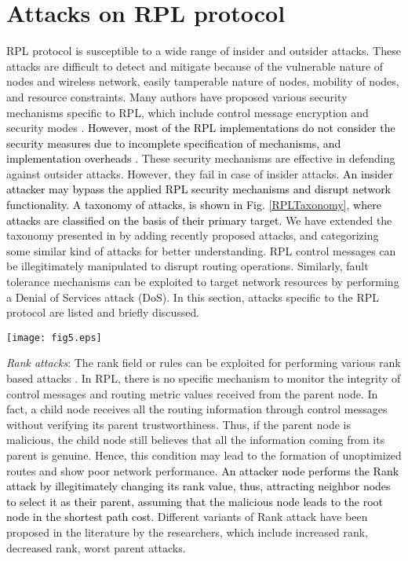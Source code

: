 \documentclass[10pt,journal,sort & compress]{IEEEtran}
\begin{document}
\section{Attacks on RPL protocol}\label{Taxonomy of Attacks on RPL protocol}
RPL protocol is susceptible to a wide range of insider and outsider attacks. These attacks are difficult to detect and mitigate because of the vulnerable nature of nodes and wireless network, easily tamperable nature of nodes, mobility of nodes, and resource constraints. Many authors have proposed various security mechanisms specific to RPL, which include control message encryption and security modes \cite{Perazzo2017a}. \textcolor{black}{However, most of the RPL implementations do not consider the security measures due to incomplete specification of mechanisms, and implementation overheads \cite{KAMGUEU201810}.} These security mechanisms are effective in defending against outsider attacks. However, they fail in case of insider attacks. \textcolor{black}{An insider attacker may bypass the applied RPL security mechanisms and disrupt network functionality.} \textcolor{black}{A taxonomy of attacks, is shown in Fig. \ref{RPLTaxonomy}, where attacks are classified on the basis of their primary target.} We have extended the taxonomy presented in \cite{Mayzaud2016Taxanomy} by adding recently proposed attacks, and categorizing some similar kind of attacks for better understanding. RPL control messages can be illegitimately manipulated to disrupt routing operations. Similarly, fault tolerance mechanisms can be exploited to target network resources by performing a Denial of Services attack (DoS). In this section, attacks specific to the RPL protocol are listed and briefly discussed.

\begin{figure*}[!h]
	\centering
	\texttt{[image: fig5.eps]}
	\caption{Detailed taxonomy of attacks specific to RPL protocol}
	\label{RPLTaxonomy}
\end{figure*}


\textit{Rank attacks}: The rank field or rules can be exploited for performing various rank based attacks \cite{xie2010routing}. In RPL, there is no specific mechanism to monitor the integrity of control messages and routing metric values received from the parent node. In fact, a child node receives all the routing information through control messages without verifying its parent trustworthiness. Thus, if the parent node is malicious, the child node still believes that all the information coming from its parent is genuine. Hence, this condition may lead to the formation of unoptimized routes and show poor network performance. \textcolor{black}{An attacker node performs the Rank attack by illegitimately changing its rank value, thus, attracting neighbor nodes to select it as their parent, assuming that the malicious node leads to the root node in the shortest path cost.} Different variants of Rank attack have been proposed in the literature by the researchers, which include increased rank, decreased rank, worst parent attacks. 
\end{document}
